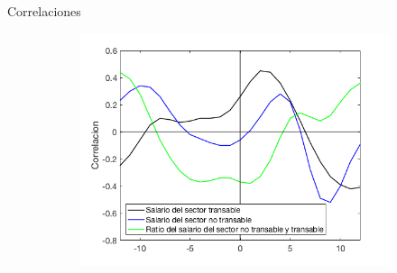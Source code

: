 \documentclass{beamer}
\begin{document}
\begin{frame}{Correlaciones}
\begin{figure}
\begin{subfigure}[b]{0.31\textwidth}
       \includegraphics[width=\textwidth]{fig18}
    \end{subfigure}
\end{figure}
\end{frame}
\end{document}
